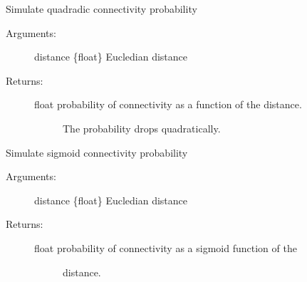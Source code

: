 \documentclass[letterpaper,10pt,english]{sphinxmanual}
\begin{document}
\begin{fulllineitems}
\begin{fulllineitems}
\end{fulllineitems}


\begin{fulllineitems}
\label{\detokenize{index:environment.Environment.prob_quadratic}}
Simulate quadradic connectivity probability
\begin{description}
\item[{Arguments:}] \leavevmode
distance \{float\} \textendash{} Eucledian distance

\item[{Returns:}] \leavevmode\begin{description}
\item[{float \textendash{} probability of connectivity as a function of the distance.}] \leavevmode
The probability drops quadratically.

\end{description}

\end{description}

\end{fulllineitems}


\begin{fulllineitems}
\label{\detokenize{index:environment.Environment.prob_sigmoid}}
Simulate sigmoid connectivity probability
\begin{description}
\item[{Arguments:}] \leavevmode
distance \{float\} \textendash{} Eucledian distance

\item[{Returns:}] \leavevmode\begin{description}
\item[{float \textendash{} probability of connectivity as a sigmoid function of the}] \leavevmode
distance.

\end{description}

\end{description}

\end{fulllineitems}


\end{fulllineitems}
\end{document}

